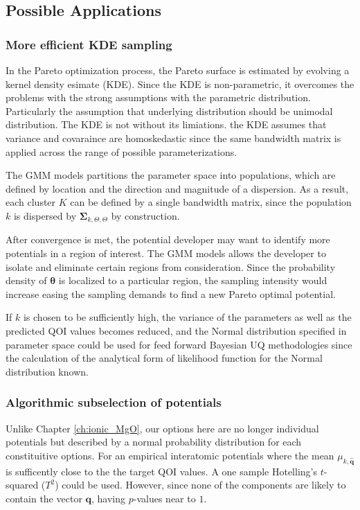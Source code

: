 \subsection{Possible Applications}

\subsubsection{More efficient KDE sampling}
In the Pareto optimization process, the Pareto surface is estimated by evolving a kernel density esimate (KDE).  Since the KDE is non-parametric, it overcomes the problems with the strong assumptions with the parametric distribution.  Particularly the assumption that underlying distribution should be unimodal distribution.  The KDE is not without its limiations. the KDE assumes that variance and covaraince are homoskedastic since the same bandwidth matrix is applied across the range of possible parameterizations.

The GMM models partitions the parameter space into populations, which are defined by location and the direction and magnitude of a dispersion.  As a result, each cluster $K$ can be defined by a single bandwidth matrix, since the population $k$ is dispersed by $\bm{\Sigma}_{k,\Theta,\Theta}$ by construction.

After convergence is met, the potential developer may want to identify more potentials in a region of interest.  The GMM models allows the developer to isolate and eliminate certain regions from consideration.  Since the probability density of $\bm{\theta}$ is localized to a particular region, the sampling intensity would increase easing the sampling demands to find a new Pareto optimal potential.

If $k$ is chosen to be sufficiently high, the variance of the parameters as well as the predicted QOI values becomes reduced, and the Normal distribution specified in parameter space could be used for feed forward Bayesian UQ methodologies since the calculation of the analytical form of likelihood function for the Normal distribution known.

\subsubsection{Algorithmic subselection of potentials}

Unlike Chapter \ref{ch:ionic_MgO}, our options here are no longer individual potentials but described by a normal probability distribution for each constituitive options.  For an empirical interatomic potentials where the mean $\mu_{k,\hat{\bm{q}}}$ is sufficently close to the the target QOI values.  A one sample Hotelling's $t$-squared  ($T^2$)\cite{hotelling1931_t2} could be used. However, since none of the components are likely to contain the vector $\bm{q}$, having $p$-values near to $1$.


